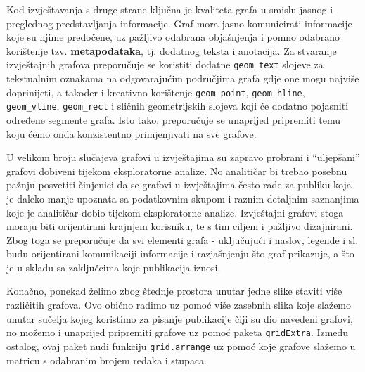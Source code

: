 \documentclass[]{book}
\theoremstyle{definition}
\theoremstyle{definition}
\theoremstyle{definition}
\theoremstyle{remark}
\begin{document}
Kod izvještavanja s druge strane ključna je kvaliteta grafa u smislu
jasnog i preglednog predstavljanja informacije. Graf mora jasno
komunicirati informacije koje su njime predočene, uz pažljivo odabrana
objašnjenja i pomno odabrano korištenje tzv. \textbf{metapodataka}, tj.
dodatnog teksta i anotacija. Za stvaranje izvještajnih grafova
preporučuje se koristiti dodatne \texttt{geom\_text} slojeve za
tekstualnim oznakama na odgovarajućim područjima grafa gdje one mogu
najviše doprinijeti, a također i kreativno korištenje
\texttt{geom\_point}, \texttt{geom\_hline}, \texttt{geom\_vline},
\texttt{geom\_rect} i sličnih geometrijskih slojeva koji će dodatno
pojasniti određene segmente grafa. Isto tako, preporučuje se unaprijed
pripremiti temu koju ćemo onda konzistentno primjenjivati na sve
grafove.

U velikom broju slučajeva grafovi u izvještajima su zapravo probrani i
``uljepšani'' grafovi dobiveni tijekom eksploratorne analize. No
analitičar bi trebao posebnu pažnju posvetiti činjenici da se grafovi u
izvještajima često rade za publiku koja je daleko manje upoznata sa
podatkovnim skupom i raznim detaljnim saznanjima koje je analitičar
dobio tijekom eksploratorne analize. Izvještajni grafovi stoga moraju
biti orijentirani krajnjem korisniku, te s tim ciljem i pažljivo
dizajnirani. Zbog toga se preporučuje da svi elementi grafa -
uključujući i naslov, legende i sl. budu orijentirani komunikaciji
informacije i razjašnjenju što graf prikazuje, a što je u skladu sa
zaključcima koje publikacija iznosi.

Konačno, ponekad želimo zbog štednje prostora unutar jedne slike staviti
više različitih grafova. Ovo obično radimo uz pomoć više zasebnih slika
koje slažemo unutar sučelja kojeg koristimo za pisanje publikacije čiji
su dio navedeni grafovi, no možemo i unaprijed pripremiti grafove uz
pomoć paketa \texttt{gridExtra}. Između ostalog, ovaj paket nudi
funkciju \texttt{grid.arrange} uz pomoć koje grafove slažemo u matricu s
odabranim brojem redaka i stupaca.
\end{document}
